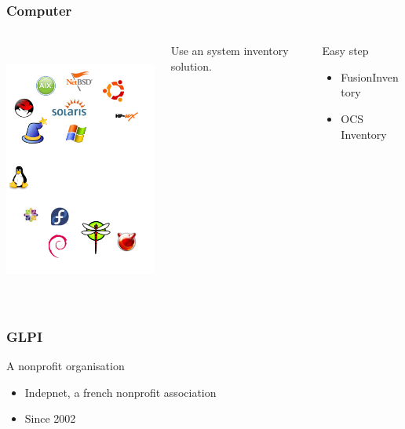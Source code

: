 \documentclass{beamer}
\begin{document}
\begin{frame}

    \frametitle{Computer}
 \begin{columns}
 \begin{column}{0.15\textwidth}
         \includegraphics[height=8.5cm]{./pics/os.pdf}
 \end{column}

 Use an system inventory solution.
 \begin{column}{1.25\textwidth}
    \begin{block}{Easy step}
        \begin{itemize}
            \item FusionInventory
            \item OCS Inventory
        \end{itemize}
    \end{block}


 \end{column}
\end{columns}
\end{frame}

\begin{frame}

    \frametitle{GLPI}

    \begin{block}{A nonprofit organisation}
        \begin{itemize}
            \item Indepnet, a french nonprofit association
            \item Since 2002
        \end{itemize}
    \end{block}

\end{frame}
\end{document}

